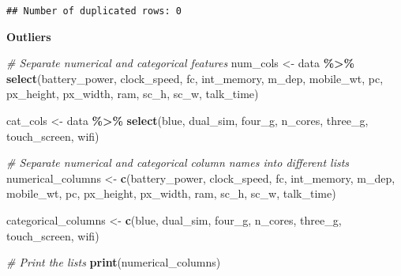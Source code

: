\documentclass[
]{article}
\newenvironment{Shaded}{\begin{snugshade}}{\end{snugshade}}
\newcommand{\CommentTok}[1]{\textcolor[rgb]{0.56,0.35,0.01}{\textit{#1}}}
\newcommand{\FunctionTok}[1]{\textcolor[rgb]{0.13,0.29,0.53}{\textbf{#1}}}
\newcommand{\NormalTok}[1]{#1}
\newcommand{\OtherTok}[1]{\textcolor[rgb]{0.56,0.35,0.01}{#1}}
\newcommand{\SpecialCharTok}[1]{\textcolor[rgb]{0.81,0.36,0.00}{\textbf{#1}}}
\newcommand{\StringTok}[1]{\textcolor[rgb]{0.31,0.60,0.02}{#1}}
\begin{document}
\begin{verbatim}
## Number of duplicated rows: 0
\end{verbatim}

\textbf{Outliers}

\begin{Shaded}
\begin{Highlighting}[]
\CommentTok{\# Separate numerical and categorical features}
\NormalTok{num\_cols }\OtherTok{\textless{}{-}}\NormalTok{ data }\SpecialCharTok{\%\textgreater{}\%} \FunctionTok{select}\NormalTok{(battery\_power, clock\_speed, fc, int\_memory, m\_dep, mobile\_wt,}
\NormalTok{                            pc, px\_height, px\_width, ram, sc\_h, sc\_w, talk\_time)}

\NormalTok{cat\_cols }\OtherTok{\textless{}{-}}\NormalTok{ data }\SpecialCharTok{\%\textgreater{}\%} \FunctionTok{select}\NormalTok{(blue, dual\_sim, four\_g, n\_cores, three\_g, touch\_screen, wifi)}

\CommentTok{\# Separate numerical and categorical column names into different lists}
\NormalTok{numerical\_columns }\OtherTok{\textless{}{-}} \FunctionTok{c}\NormalTok{(}\StringTok{\textquotesingle{}battery\_power\textquotesingle{}}\NormalTok{, }\StringTok{\textquotesingle{}clock\_speed\textquotesingle{}}\NormalTok{, }\StringTok{\textquotesingle{}fc\textquotesingle{}}\NormalTok{, }\StringTok{\textquotesingle{}int\_memory\textquotesingle{}}\NormalTok{, }\StringTok{\textquotesingle{}m\_dep\textquotesingle{}}\NormalTok{, }
                       \StringTok{\textquotesingle{}mobile\_wt\textquotesingle{}}\NormalTok{, }\StringTok{\textquotesingle{}pc\textquotesingle{}}\NormalTok{, }\StringTok{\textquotesingle{}px\_height\textquotesingle{}}\NormalTok{, }\StringTok{\textquotesingle{}px\_width\textquotesingle{}}\NormalTok{, }\StringTok{\textquotesingle{}ram\textquotesingle{}}\NormalTok{, }\StringTok{\textquotesingle{}sc\_h\textquotesingle{}}\NormalTok{, }
                       \StringTok{\textquotesingle{}sc\_w\textquotesingle{}}\NormalTok{, }\StringTok{\textquotesingle{}talk\_time\textquotesingle{}}\NormalTok{)}

\NormalTok{categorical\_columns }\OtherTok{\textless{}{-}} \FunctionTok{c}\NormalTok{(}\StringTok{\textquotesingle{}blue\textquotesingle{}}\NormalTok{, }\StringTok{\textquotesingle{}dual\_sim\textquotesingle{}}\NormalTok{, }\StringTok{\textquotesingle{}four\_g\textquotesingle{}}\NormalTok{, }\StringTok{\textquotesingle{}n\_cores\textquotesingle{}}\NormalTok{, }\StringTok{\textquotesingle{}three\_g\textquotesingle{}}\NormalTok{, }
                         \StringTok{\textquotesingle{}touch\_screen\textquotesingle{}}\NormalTok{, }\StringTok{\textquotesingle{}wifi\textquotesingle{}}\NormalTok{)}

\CommentTok{\# Print the lists}
\FunctionTok{print}\NormalTok{(numerical\_columns)}
\end{Highlighting}
\end{Shaded}
\end{document}
